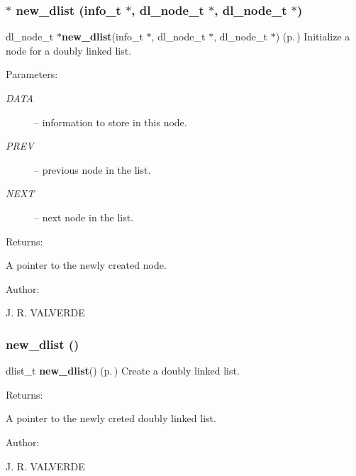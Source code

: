 \subsubsection{$\ast$ new\_\-dlist (info\_\-t $\ast$, {\bf dl\_\-node\_\-t} $\ast$, {\bf dl\_\-node\_\-t} $\ast$)}\label{P__dlist_8h_a1}


dl\_\-node\_\-t $\ast${\bf new\_\-dlist}(info\_\-t $\ast$, dl\_\-node\_\-t $\ast$, dl\_\-node\_\-t $\ast$) {\rm (p.\,\pageref{P__dlist_8h_a1})} Initialize a node for a doubly linked list.

\begin{Desc}
\item[Parameters: ]\par
\begin{description}
\item[{\em 
DATA}]-- information to store in this node. \item[{\em 
PREV}]-- previous node in the list. \item[{\em 
NEXT}]-- next node in the list. \end{description}
\end{Desc}
\begin{Desc}
\item[Returns: ]\par
A pointer to the newly created node.\end{Desc}
\begin{Desc}
\item[Author: ]\par
J. R. VALVERDE \end{Desc}
\subsubsection{ new\_\-dlist ()}\label{P__dlist_8h_a0}


dlist\_\-t {\bf new\_\-dlist}() {\rm (p.\,\pageref{P__dlist_8h_a0})} Create a doubly linked list.

\begin{Desc}
\item[Returns: ]\par
A pointer to the newly creted doubly linked list.\end{Desc}
\begin{Desc}
\item[Author: ]\par
J. R. VALVERDE \end{Desc}
